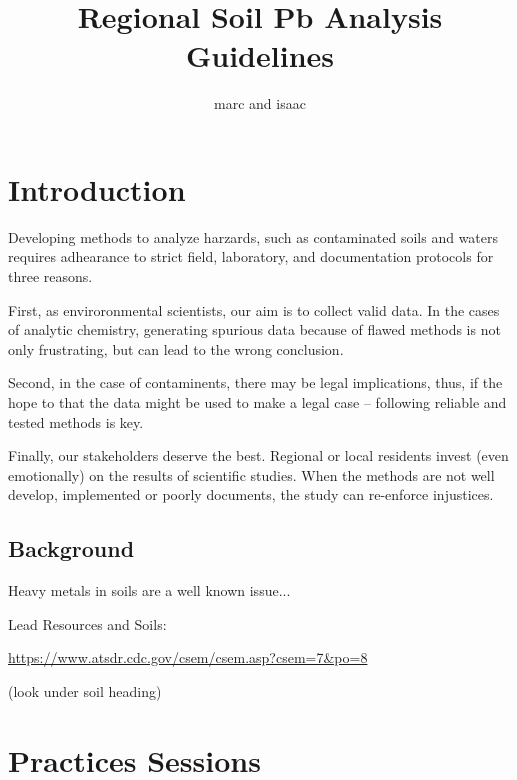 \documentclass{article}\usepackage[]{graphicx}\usepackage[]{color}
\title{Regional Soil Pb Analysis Guidelines}
\author{marc and isaac}
\begin{document}
\maketitle

\section{Introduction}

Developing methods to analyze harzards, such as contaminated soils and waters requires adhearance to strict field, laboratory, and documentation protocols for three reasons. 

First, as enviroronmental scientists, our aim is to collect valid data. In the cases of analytic chemistry, generating spurious data because of flawed methods is not only frustrating, but can lead to the wrong conclusion.

Second, in the case of contaminents, there may be legal implications, thus, if the hope to that the data might be used to make a legal case -- following reliable and tested methods is key. 

Finally, our stakeholders deserve the best. Regional or local residents invest (even emotionally) on the results of scientific studies. When the methods are not well develop, implemented or poorly documents, the study can re-enforce injustices. 

\subsection{Background}

Heavy metals in soils are a well known issue...




Lead Resources and Soils:

\url{https://www.atsdr.cdc.gov/csem/csem.asp?csem=7&po=8}

(look under soil heading) 

\section{Practices Sessions}
\end{document}
